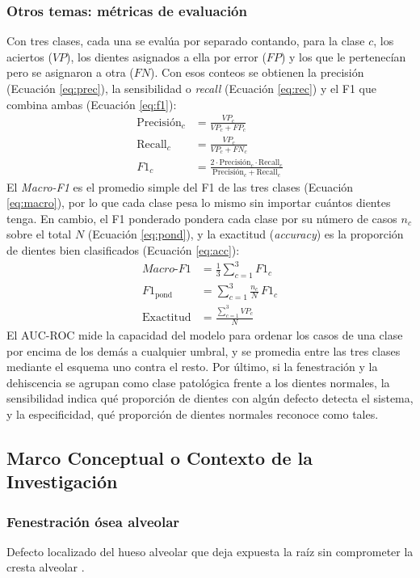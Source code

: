 \documentclass[12pt,a4paper]{article}
\begin{document}
\subsubsection{Otros temas: métricas de evaluación}
Con tres clases, cada una se evalúa por separado contando, para la clase
$c$, los aciertos ($VP$), los dientes asignados a ella por error ($FP$) y
los que le pertenecían pero se asignaron a otra ($FN$). Con esos conteos
se obtienen la precisión (Ecuación \eqref{eq:prec}), la sensibilidad o
\textit{recall} (Ecuación \eqref{eq:rec}) y el F1 que combina ambas
(Ecuación \eqref{eq:f1}):
\begin{align}
\text{Precisión}_c &= \frac{VP_c}{VP_c + FP_c} \label{eq:prec}\\
\text{Recall}_c &= \frac{VP_c}{VP_c + FN_c} \label{eq:rec}\\
F1_c &= \frac{2\cdot \text{Precisión}_c \cdot \text{Recall}_c}{\text{Precisión}_c + \text{Recall}_c} \label{eq:f1}
\end{align}
El \textit{Macro-F1} es el promedio simple del F1 de las tres clases
(Ecuación \ref{eq:macro}), por lo que cada clase pesa lo mismo sin importar
cuántos dientes tenga. En cambio, el F1 ponderado pondera cada clase por
su número de casos $n_c$ sobre el total $N$ (Ecuación \ref{eq:pond}), y la
exactitud (\textit{accuracy}) es la proporción de dientes bien clasificados
(Ecuación \ref{eq:acc}):
\begin{align}
\textit{Macro-F1} &= \frac{1}{3}\sum_{c=1}^{3} F1_c \label{eq:macro}\\
F1_{\mathrm{pond}} &= \sum_{c=1}^{3} \frac{n_c}{N}\, F1_c \label{eq:pond}\\
\mathrm{Exactitud} &= \frac{\sum_{c=1}^{3} VP_c}{N} \label{eq:acc}
\end{align}
El AUC-ROC mide la capacidad del modelo para ordenar los casos de una
clase por encima de los demás a cualquier umbral, y se promedia entre las
tres clases mediante el esquema uno contra el resto. Por último, si la
fenestración y la dehiscencia se agrupan como clase patológica frente a
los dientes normales, la sensibilidad indica qué proporción de dientes
con algún defecto detecta el sistema, y la especificidad, qué proporción
de dientes normales reconoce como tales.

\subsection{Marco Conceptual o Contexto de la Investigación}
\subsubsection{Fenestración ósea alveolar}
Defecto localizado del hueso alveolar que deja expuesta la raíz sin
comprometer la cresta alveolar \parencite{liu2025fdtooth}.
\end{document}
